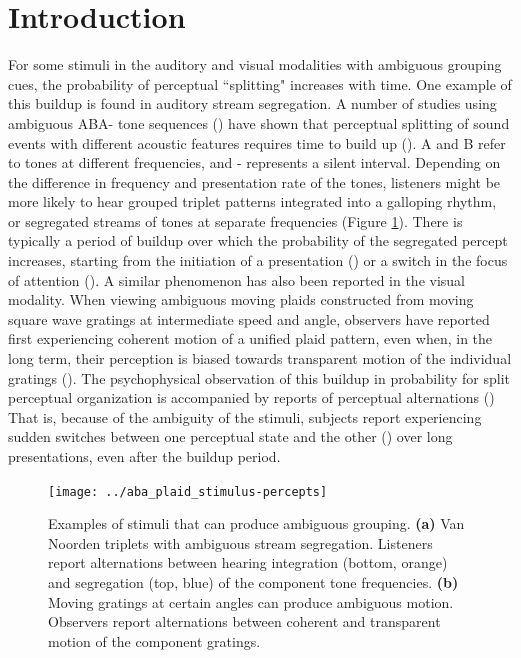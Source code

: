 \documentclass{frontiersSCNS} %
\begin{document}
\section{Introduction}

For some stimuli in the auditory and visual modalities with ambiguous grouping cues, the probability of perceptual ``splitting" increases with time. One example of this buildup is found in auditory stream segregation. A number of studies using ambiguous ABA- tone sequences (\cite{Noorden1975}) have shown that perceptual splitting of sound events with different acoustic features requires time to build up (\cite{Bregman1978, Anstis1985}).  A and B refer to tones at different frequencies, and - represents a silent interval. Depending on the difference in frequency and presentation rate of the tones, listeners might be more likely to hear grouped triplet patterns integrated into a galloping rhythm, or segregated streams of tones at separate frequencies (Figure \ref{fig:percepts_timecourse}). There is typically a period of buildup over which the probability of the segregated percept increases, starting from the initiation of a presentation (\cite{Bregman1978, Anstis1985}) or a switch in the focus of attention (\cite{Cusack2004}).  A similar phenomenon has also been reported in the visual modality. When viewing ambiguous moving plaids constructed from moving square wave gratings at intermediate speed and angle, observers have reported first experiencing coherent motion of a unified plaid pattern, even when, in the long term, their perception is biased towards transparent motion of the individual gratings (\cite{Rubin2004}). The psychophysical observation of this buildup in probability for split perceptual organization is accompanied by reports of perceptual alternations (\cite{Dieke2012})%
That is, because of the ambiguity of the stimuli, subjects report experiencing sudden switches between one perceptual state and the other (\cite{Pressnitzer2006, Hupe2012}) over long presentations, even after the buildup period.

\begin{figure}
	\centering
	\texttt{[image: ../aba\_plaid\_stimulus-percepts]}
	\caption{Examples of stimuli that can produce ambiguous grouping. \textbf{(a)} Van Noorden triplets with ambiguous stream segregation. Listeners report alternations between hearing integration (bottom, orange) and segregation (top, blue) of the component tone frequencies. \textbf{(b)} Moving gratings at certain angles can produce ambiguous motion. Observers report alternations between coherent and transparent motion of the component gratings.}
	\label{fig:percepts_timecourse}
\end{figure}
\end{document}
